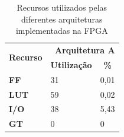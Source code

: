 \documentclass[11pt,a4paper]{article}
\begin{document}
		\begin{table}[h!]
			\centering
			\caption{Recursos utilizados pelas diferentes arquiteturas implementadas na FPGA}
				\label{table:recursosA}
				\begin{tabular}{l|ll}
					\hline
					\multicolumn{1}{c|}{\multirow{2}{*}{\textbf{Recurso}}} & \multicolumn{2}{r}{\textbf{Arquitetura A}} \\ \cline{2-3} 
					\multicolumn{1}{c|}{}                                  & \multicolumn{1}{c}{\textbf{Utilização}} & \multicolumn{1}{c}{\textbf{\%}} \\ \hline
					\textbf{FF}                                            & 31                                      & 0,01                            \\
					\textbf{LUT}                                           & 59                                      & 0,02                            \\
					\textbf{I/O}                                           & 38                                      & 5,43         			   		\\
					\textbf{GT}                                            & 0                                       & 0                               \\ \hline
				\end{tabular}%
		\end{table}
	
	
	
	
	
	
	
\end{document}
